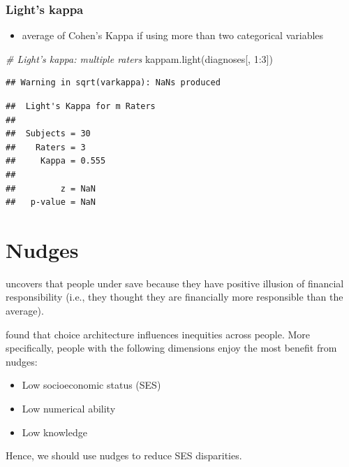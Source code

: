 \documentclass[
]{book}
\newenvironment{Shaded}{\begin{snugshade}}{\end{snugshade}}
\newcommand{\CommentTok}[1]{\textcolor[rgb]{0.56,0.35,0.01}{\textit{#1}}}
\newcommand{\DecValTok}[1]{\textcolor[rgb]{0.00,0.00,0.81}{#1}}
\newcommand{\FunctionTok}[1]{\textcolor[rgb]{0.00,0.00,0.00}{#1}}
\newcommand{\NormalTok}[1]{#1}
\newcommand{\SpecialCharTok}[1]{\textcolor[rgb]{0.00,0.00,0.00}{#1}}
\providecommand{\tightlist}{%
  \setlength{\itemsep}{0pt}\setlength{\parskip}{0pt}}
\begin{document}
\hypertarget{lights-kappa}{%
\subsection{Light's kappa}\label{lights-kappa}}

\begin{itemize}
\tightlist
\item
  average of Cohen's Kappa if using more than two categorical variables
\end{itemize}

\begin{Shaded}
\begin{Highlighting}[]
\CommentTok{\# Light’s kappa: multiple raters}
\FunctionTok{kappam.light}\NormalTok{(diagnoses[, }\DecValTok{1}\SpecialCharTok{:}\DecValTok{3}\NormalTok{])}
\end{Highlighting}
\end{Shaded}

\begin{verbatim}
## Warning in sqrt(varkappa): NaNs produced
\end{verbatim}

\begin{verbatim}
##  Light's Kappa for m Raters
## 
##  Subjects = 30 
##    Raters = 3 
##     Kappa = 0.555 
## 
##         z = NaN 
##   p-value = NaN
\end{verbatim}

\hypertarget{nudges}{%
\chapter{Nudges}\label{nudges}}

\citep{Garbinsky_2020} uncovers that people under save because they have positive illusion of financial responsibility (i.e.,
they thought they are financially more responsible than the average).

\citep{Mrkva_2021} found that choice architecture influences inequities across people. More specifically, people with the
following dimensions enjoy the most benefit from nudges:

\begin{itemize}
\tightlist
\item
  Low socioeconomic status (SES)
\item
  Low numerical ability
\item
  Low knowledge
\end{itemize}

Hence, we should use nudges to reduce SES disparities.
\end{document}

